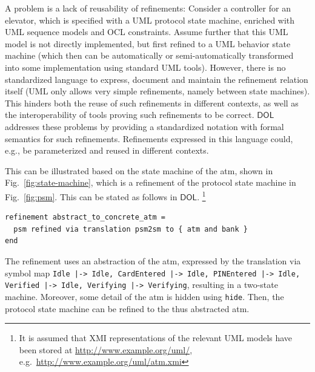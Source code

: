 \documentclass[10pt, a4paper]{isov2}
\newcommand*{\syntax}[1]{\texttt{#1}}
\newcommand*{\DOL}{\ensuremath{\mathsf{DOL}}\xspace}
\newcommand{\uml}[1]{\textsf{#1}}
\begin{document}

\label{model-2}

A problem is a lack of reusability of refinements: Consider a controller for an elevator, which is specified with a UML protocol state machine, enriched with UML 
sequence models and OCL constraints. Assume further that this UML model is not directly implemented, but first refined to a UML behavior state machine (which then 
can be automatically or semi-automatically transformed into some implementation using standard UML tools). However, there is no standardized language to 
express, document and maintain the refinement relation itself (UML only allows very simple refinements, namely between state machines). This hinders both the 
reuse of such refinements in different contexts, as well as the interoperability of tools proving such refinements to be correct. \DOL  
addresses these problems by providing a standardized notation with formal semantics for such refinements. Refinements expressed in this language could, e.g., be 
parameterized and reused in different contexts.

 This can be illustrated based on the state
machine of the \uml{atm}, shown in Fig.~\ref{fig:state-machine}, which is a  
refinement of the protocol state machine in Fig.~\ref{fig:psm}. This can be stated as follows in \DOL. 
\footnote{  It is assumed that XMI representations of the relevant UML models have been 
stored at \url{http://www.example.org/uml/},
e.g.\ \url{http://www.example.org/uml/atm.xmi} } 


\begin{lstlisting}[basicstyle=\ttfamily,language=dolText,escapechar=@,mathescape]
refinement abstract_to_concrete_atm =
  psm refined via translation psm2sm to { atm and bank }
end
\end{lstlisting}

The refinement uses an abstraction of the \uml{atm}, expressed by the
translation via symbol map \texttt{Idle |-> Idle, CardEntered |-> Idle, PINEntered |-> Idle, Verified |-> Idle, Verifying |-> Verifying}, resulting in a two-state machine. Moreover, some detail of the \uml{atm} is hidden using
\syntax{hide}. Then, the protocol state machine can be refined to
the thus abstracted \uml{atm}.
\end{document}
